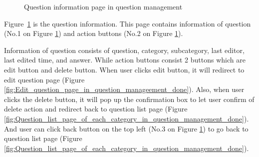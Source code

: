 \documentclass[12pt,oneside,openright,a4paper]{cpe-english-project}
\begin{document}
		\begin{figure}[!h]\centering
			\caption{Question information page in question management}\label{fig:Question_information_page_in_question_management_done}
		\end{figure}
		\begin{flushleft}
			Figure~\ref*{fig:Question_information_page_in_question_management_done} is the question information. This page contains information of question (No.1 on Figure \ref*{fig:Question_information_page_in_question_management_done}) and action buttons (No.2 on Figure \ref*{fig:Question_information_page_in_question_management_done}).
		\end{flushleft}
		\begin{flushleft}
			Information of question consists of question, category, subcategory, last editor, last edited time, and answer. While action buttons consist 2 buttons which are edit button and delete button. When user clicks edit button, it will redirect to edit question page (Figure \ref*{fig:Edit_question_page_in_question_manageement_done}). Also, when user clicks the delete button, it will pop up the confirmation box to let user confirm of delete action and redirect back to question list page (Figure \ref*{fig:Question_list_page_of_each_category_in_question_management_done}). And user can click back button on the top left (No.3 on Figure \ref*{fig:Question_information_page_in_question_management_done}) to go back to question list page (Figure \ref*{fig:Question_list_page_of_each_category_in_question_management_done}).
		\end{flushleft}
\end{document}
